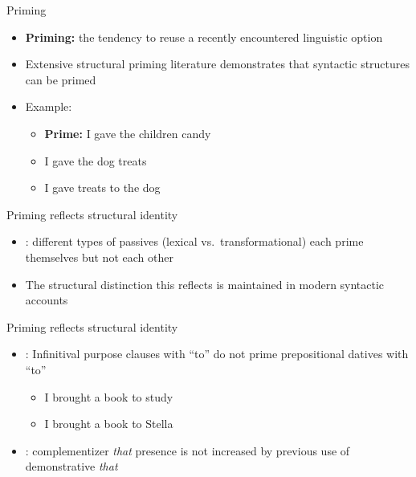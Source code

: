 \documentclass{digs-slides}
\newcommand{\includegraph}[2][]{\mode<beamer>{\texttt{[image: \#2]}}
    \mode<handout>{\texttt{[image: \#2]}}}
\begin{document}
\begin{frame}{Priming}
    \begin{itemize}
      \item \textbf{Priming:} the tendency to reuse a recently
        encountered linguistic option
      \item Extensive structural priming
        literature \parencite[beginning with][]{Bock:1986}
        demonstrates that syntactic structures can be primed
      \item Example:
        \begin{itemize}
          \item \textbf{Prime:} I gave the children candy
          \item[\ding{51}] I gave the dog treats
          \item[\ding{55}] I gave treats to the dog
        \end{itemize}
    \end{itemize}
\end{frame}

\begin{frame}{Priming reflects structural identity}
	\begin{itemize}
          \item \textcite{Estival:1985}: different types of passives (lexical vs.\ transformational) each prime themselves but not each other
          \item The structural distinction this reflects is maintained in modern syntactic accounts \parencite[e.g.][]{Embick:2004}
	\end{itemize}
        \begin{center}
            \includegraph{figures/estival}
        \end{center}
\end{frame}


\begin{frame}{Priming reflects structural identity}
	\begin{itemize}
          \item \textcite{Bock:1990}: Infinitival purpose clauses with
            “to” do not prime prepositional datives with “to”
            \begin{itemize}
              \item I brought a book to study
              \item I brought a book to Stella
            \end{itemize}
          \item \textcite{Ferreira:2003}: complementizer \textit{that}
            presence is not increased by previous use of demonstrative \textit{that}
	\end{itemize}
\end{frame}
\end{document}
